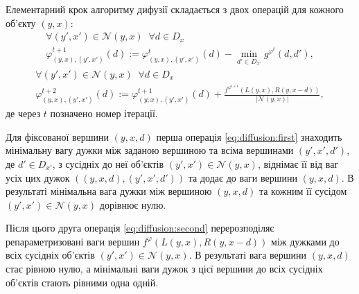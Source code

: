 Елементарний крок алгоритму дифузії
складається з двох операцій для кожного об'єкту $\left(y, x \right)$:
\begin{equation}\label{eq:diffusion:first}
\begin{split}
    \forall \left( y', x' \right) \in \mathcal{N} \left(y,x\right) \; \;
    \forall d \in D_x \\
    \varphi_{\left(y, x \right), \left(y', x' \right)}^{t + 1} \left( d \right)
    := \varphi_{\left(y, x \right), \left(y', x' \right)}^t \left( d \right)
    - \min \limits_{d' \in D_{x'}}
        g^{\varphi^t} \left(d, d' \right),
\end{split}
\end{equation}
\begin{equation}\label{eq:diffusion:second}
\begin{split}
    \forall \left( y', x' \right) \in \mathcal{N} \left(y,x\right) \; \;
    \forall d \in D_x \\
    \varphi_{\left(y, x \right), \left(y', x' \right)}^{t + 2} \left( d \right)
    := \varphi_{\left(y, x \right), \left(y', x' \right)}^{t + 1} \left( d \right)
    + \frac{f^{\varphi^{t + 1}} \left(L \left(y, x\right) , R \left(y, x - d\right)\right)}{\left| \mathcal{N} \left(y, x \right)\right|},
\end{split}
\end{equation}
де через $t$ позначено номер ітерації.

Для фіксованої вершини $\left( y, x, d \right)$ перша операція
\ref{eq:diffusion:first} знаходить мінімальну вагу дужки між заданою вершиною
та всіма вершинами $\left( y', x', d'\right)$,
де $d' \in D_{x'}$,
з сусідніх до неї об'єктів
$\left(y', x' \right) \in \mathcal{N} \left(y, x \right)$,
віднімає її від ваг усіх цих дужок
$\left( \left(y, x, d\right), \left( y', x', d'\right)\right)$
та додає до ваги вершини $\left(y, x, d \right)$.
В результаті мінімальна вага дужки між вершиною $\left( y, x, d \right)$
та кожним її сусідом $\left(y', x' \right) \in \mathcal{N} \left(y, x \right)$
дорівнює нулю.

Після цього друга операція \ref{eq:diffusion:second}
перерозподіляє репараметризовані ваги вершин
$f^{\varphi} \left(
    L \left(y, x \right) , R \left(y, x - d \right)
\right) $
між дужками до всіх сусідніх об'єктів
$\left(y', x' \right) \in \mathcal{N} \left(y, x \right)$.
В результаті вага вершини $ \left( y, x, d \right)$ стає рівною нулю,
а мінімальні ваги дужок з цієї вершини до всіх сусідніх об'єктів стають
рівними одна одній.


